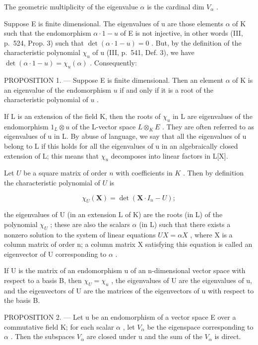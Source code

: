 The geometric multiplicity of the eigenvalue \(\alpha\) is the cardinal dim \(V_{\alpha}\) .

Suppose E is finite dimensional. The eigenvalues of u are those elements \(\alpha\) of K such that the endomorphism \(\alpha \cdot 1 - u\) of E is not injective, in other words (III, p.~524, Prop. 3) such that \(\det(\alpha \cdot 1 - u) = 0\) . But, by the definition of the characteristic polynomial \(\chi_{u}\) of u (III, p.~541, Def. 3), we have \(\det(\alpha \cdot 1 - u) = \chi_{u}(\alpha)\) . Consequently:

PROPOSITION 1. --- Suppose E is finite dimensional. Then an element \(\alpha\) of K is an eigenvalue of the endomorphism \(u\) if and only if it is a root of the characteristic polynomial of \(u\) .

If L is an extension of the field K, then the roots of \(\chi_{u}\) in L are eigenvalues of the endomorphism \(1_{L} \otimes u\) of the L-vector space \(L \otimes_{K} E\) . They are often referred to as eigenvalues of u in L. By abuse of language, we say that all the eigenvalues of u belong to L if this holds for all the eigenvalues of u in an algebraically closed extension of L; this means that \(\chi_{u}\) decomposes into linear factors in L{[}X{]}.

Let \(U\) be a square matrix of order \(n\) with coefficients in \(K\) . Then by definition the characteristic polynomial of \(U\) is

\[
\chi_ {U} (\mathbf {X}) = \det \left(\mathbf {X} \cdot I _ {n} - U\right);
\]

the eigenvalues of U (in an extension L of K) are the roots (in L) of the polynomial \(\chi_{U}\) ; these are also the scalars \(\alpha\) (in L) such that there exists a nonzero solution to the system of linear equations \(UX = \alpha X\) , where X is a column matrix of order n; a column matrix X satisfying this equation is called an eigenvector of U corresponding to \(\alpha\) .

If U is the matrix of an endomorphism u of an n-dimensional vector space with respect to a basis B, then \(\chi_{U} = \chi_{u}\) , the eigenvalues of U are the eigenvalues of u, and the eigenvectors of U are the matrices of the eigenvectors of u with respect to the basis B.

PROPOSITION 2. --- Let u be an endomorphism of a vector space E over a commutative field K; for each scalar \(\alpha\) , let \(V_{\alpha}\) be the eigenspace corresponding to \(\alpha\) . Then the subspaces \(V_{\alpha}\) are closed under u and the sum of the \(V_{\alpha}\) is direct.

